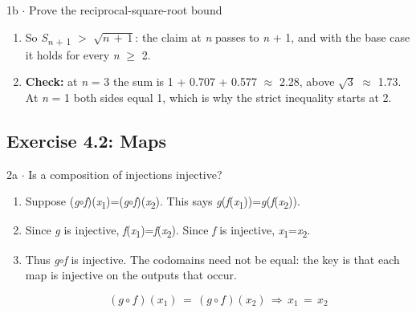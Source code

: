 \documentclass[11pt]{article}
\begin{document}
\begin{keepsection}
\begin{workedbox}{1b \ensuremath{\cdot} Prove the reciprocal-square-root bound}
\begin{enumerate}
\begin{equation*}\sqrt{{n}({n}\, +\, 1)}\, +\, 1\, \geq \, {n}\, +\, 1\, \Leftrightarrow \, \sqrt{{n}({n}\, +\, 1)}\, \geq \, {n}\end{equation*}

This holds because \textit{n}(\textit{n} + 1) \ensuremath{>} \textit{n}\textsuperscript{2}.
\item So \textit{S}\textsubscript{\textit{n} + 1} \ensuremath{>} \ensuremath{\sqrt{{n}\, +\, 1}}: the claim at \textit{n} passes to \textit{n} + 1, and with the base case it holds for every \textit{n} \ensuremath{\geq} 2.
\item \textbf{Check:} at \textit{n} = 3 the sum is 1 + 0.707 + 0.577 \ensuremath{\approx} 2.28, above \ensuremath{\sqrt{3}} \ensuremath{\approx} 1.73. At \textit{n} = 1 both sides equal 1, which is why the strict inequality starts at 2.
\end{enumerate}
\end{workedbox}

\end{keepsection}
\begin{keepsection}\subsection{Exercise 4.2: Maps}

\begin{workedbox}{2a \ensuremath{\cdot} Is a composition of injections injective?}
\begin{enumerate}
\item Suppose (\textit{g}\ensuremath{\circ}\textit{f})(\textit{x}\textsubscript{1})=(\textit{g}\ensuremath{\circ}\textit{f})(\textit{x}\textsubscript{2}). This says \textit{g}(\textit{f}(\textit{x}\textsubscript{1}))=\textit{g}(\textit{f}(\textit{x}\textsubscript{2})).
\item Since \textit{g} is injective, \textit{f}(\textit{x}\textsubscript{1})=\textit{f}(\textit{x}\textsubscript{2}). Since \textit{f} is injective, \textit{x}\textsubscript{1}=\textit{x}\textsubscript{2}.
\item {}
Thus \textit{g}\ensuremath{\circ}\textit{f} is injective. The codomains need not be equal: the key is that each map is injective on the outputs that occur.

\begin{equation*}({g}\circ {f})({x}_{1})\, =\, ({g}\circ {f})({x}_{2})\, \Rightarrow \, {x}_{1}\, =\, {x}_{2}\end{equation*}
\end{enumerate}
\end{workedbox}

\end{keepsection}
\end{document}
